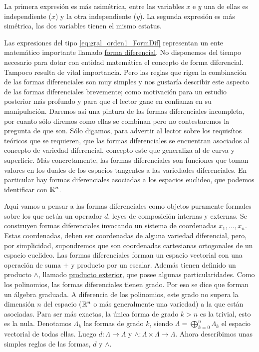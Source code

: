  La primera expresión es más asimétrica, entre las variables $x$ e $y$ una de ellas es independiente ($x$) y la otra independiente  ($y$).  La segunda expresión es  más simétrica, las dos variables tienen el mismo estatus.

 Las expresiones del tipo \eqref{eq:gral_orden1_FormDif} representan un ente matemático importante llamado \href{http://es.wikipedia.org/wiki/Forma_diferencial}{forma diferencial}. No disponemos del tiempo necesario para dotar con entidad matemática el concepto de forma diferencial. Tampoco  resulta de vital importancia. Pero las reglas que rigen la combinación de las formas diferenciales son muy simples y nos gustaría describir este aspecto de las formas diferenciales brevemente; como motivación para un estudio posterior más profundo y para que el lector gane en confianza en su manipulación. Daremos así una pintura de las formas diferenciales incompleta, por cuanto sólo diremos como ellas se combinan pero no contestaremos la pregunta de que son. Sólo digamos, para advertir al lector sobre los requisítos teóricos que se requieren, que las formas diferenciales se encuentran asociados al concepto de variedad diferencial, concepto este que generaliza al de curva y superficie.  Más 
concretamente, las formas diferenciales son funciones que toman valores en los duales de los espacios tangentes a las variedades diferenciales. En particular hay formas diferenciales asociadas a los espacios euclideo, que podemos identificar con  $\mathbb{R}^n$.

Aqui vamos a pensar a las formas diferenciales como objetos puramente formales sobre los que actúa un operador $d$, leyes de composición internas y externas. Se construyen formas diferenciales invocando un sistema de coordenadas $x_1,\ldots,x_n$. Estas coordenadas, deben ser coordenadas de alguna variedad diferencial, pero, por simplicidad, supondremos que son coordenadas cartesianas ortogonales de un espacio euclideo. Las formas diferenciales forman un espacio vectorial con una operación de suma $+$ y producto por un escalar. Además tienen definido un producto $\wedge$, llamado \href{https://es.wikipedia.org/wiki/Producto_exterior}{producto exterior}, que posee  algunas particularidades.  Como los polinomios, las formas diferenciales tienen grado. Por eso se dice que forman un álgebra graduada. A diferencia de los polinomios, este grado no supera la dimensión $n$ del espacio ($\mathbb{R}^n$ o más generalmente una variedad) a la que están asociadas. Para ser más exactas, la única forma de 
grado $k>n$ es la trivial, esto es la nula. Denotamos $\Lambda_k$ las formas de grado $k$, siendo $\Lambda =\bigoplus_{k=0}^{n}\Lambda_k$ el espacio vectorial de todas ellas. Luego $d:\Lambda\to\Lambda$ y $\wedge:\Lambda\times\Lambda\to \Lambda$. Ahora describimos unas simples reglas de las formas,  $d$ y $\wedge$.



